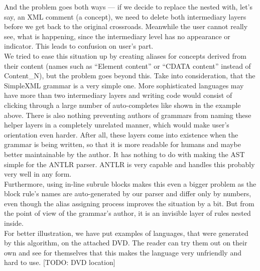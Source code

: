And the problem goes both ways --- if we decide to replace the nested  with, let's say, an XML comment (a  concept), we need to delete both intermediary layers before we get back to the original  crossroads.
Meanwhile the user cannot really see, what is happening, since the intermediary level has no appearance or indicator.
This leads to confusion on user's part.
\\

We tried to ease this situation up by creating aliases for concepts derived from their content (names such as “Element content” or “CDATA content” instead of Content{\_}N), but the problem goes beyond this.
Take into consideration, that the SimpleXML grammar is a very simple one.
More sophisticated languages may have more than two intermediary layers and writing code would consist of clicking through a large number of auto-completes like shown in the example above.
There is also nothing preventing authors of grammars from naming these helper layers in a completely unrelated manner, which would make user's orientation even harder.
After all, these layers come into existence when the grammar is being written, so that it is more readable for humans and maybe better maintainable by the author.
It has nothing to do with making the AST simple for the ANTLR parser.
ANTLR is very capable and handles this probably very well in any form.
\\

Furthermore, using in-line subrule blocks makes this even a bigger problem as the block rule's names are auto-generated by our parser and differ only by numbers, even though the alias assigning process improves the situation by a bit.
But from the point of view of the grammar's author, it is an invisible layer of rules nested inside.
\\

For better illustration, we have put examples of languages, that were generated by this algorithm, on the attached DVD. The reader can try them out on their own and see for themselves that this makes the language very unfriendly and hard to use. [TODO: DVD location]
